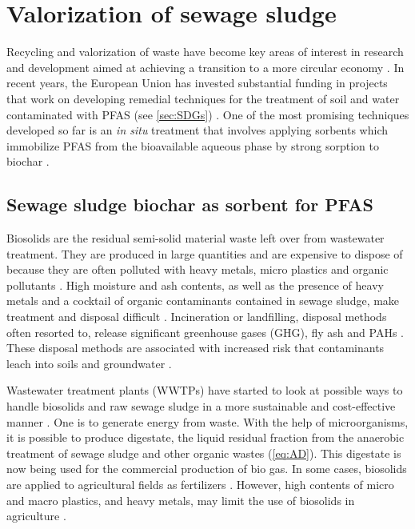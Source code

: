 
\section{Valorization of sewage sludge}
Recycling and valorization of waste have become key areas of interest in research and development aimed at achieving a transition to a more circular economy \citep{Ahmad2014}. In recent years, the European Union has invested substantial funding in projects that work on developing remedial techniques for the treatment of soil and water contaminated with PFAS (see \cref{sec:SDGs}) \citep{EC2020PFAS,ECHA2020}. One of the most promising techniques developed so far is an \textit{in situ} treatment that involves applying sorbents which immobilize PFAS from the bioavailable aqueous phase by strong sorption to biochar \citep{Ahmad2014,Sormo2021,Kupryianchyk2016b}.

\subsection{Sewage sludge biochar as sorbent for PFAS}
Biosolids are the residual semi-solid material waste left over from wastewater treatment. They are produced in large quantities and are expensive to dispose of because they are often polluted with heavy metals, micro plastics and organic pollutants \citep{Raheem2018}. High moisture and ash contents, as well as the presence of heavy metals and a cocktail of organic contaminants contained in sewage sludge, make treatment and disposal difficult \citep{Li2019}. Incineration or landfilling, disposal methods often resorted to, release significant greenhouse gases (\acrshort{GHG}), fly ash and \acrshort{PAHs} \citep{huang2022comparative}. These disposal methods are associated with increased risk that contaminants leach into soils and groundwater \citep{propp2021organic}. 

Wastewater treatment plants (WWTPs) have started to look at possible ways to handle biosolids and raw sewage sludge in a more sustainable and cost-effective manner \citep{Raheem2018}. One is to generate energy from waste. With the help of microorganisms, it is possible to produce digestate, the liquid residual fraction from the anaerobic treatment of sewage sludge and other organic wastes (\cref{eq:AD}). This digestate is now being used for the commercial production of bio gas. In some cases, biosolids are applied to agricultural fields as fertilizers \citep{moodie2021legacy}. However, high contents of micro and macro plastics, and heavy metals, may limit the use of biosolids in agriculture \citep{mohajerani2020microplastics}.

